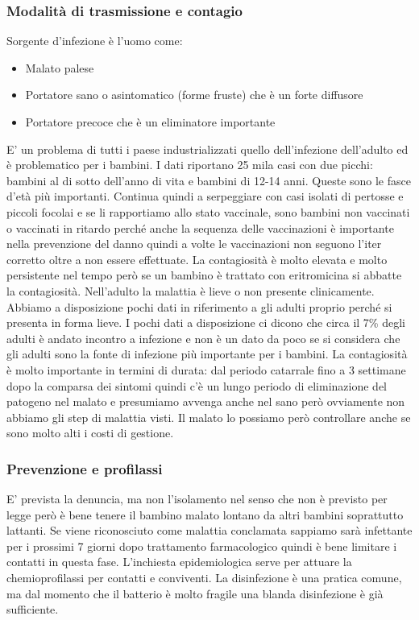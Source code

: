 \subsubsection{Modalità di trasmissione e contagio}

  Sorgente d'infezione è l'uomo come:

\begin{itemize}
\item
  Malato palese
\item
  Portatore sano o asintomatico (forme fruste) che è un forte diffusore
\item
  Portatore precoce che è un eliminatore importante
\end{itemize}

  E' un problema di tutti i paese industrializzati quello dell'infezione
  dell'adulto ed è problematico per i bambini. I dati riportano 25 mila
  casi con due picchi: bambini al di sotto dell'anno di vita e bambini
  di 12-14 anni. Queste sono le fasce d'età più importanti. Continua
  quindi a serpeggiare con casi isolati di pertosse e piccoli focolai e
  se li rapportiamo allo stato vaccinale, sono bambini non vaccinati o
  vaccinati in ritardo perché anche la sequenza delle vaccinazioni è
  importante nella prevenzione del danno quindi a volte le vaccinazioni
  non seguono l'iter corretto oltre a non essere effettuate. La
  contagiosità è molto elevata e molto persistente nel tempo però se un
  bambino è trattato con eritromicina si abbatte la contagiosità.
  Nell'adulto la malattia è lieve o non presente clinicamente. Abbiamo a
  disposizione pochi dati in riferimento a gli adulti proprio perché si
  presenta in forma lieve. I pochi dati a disposizione ci dicono che
  circa il 7\% degli adulti è andato incontro a infezione e non è un
  dato da poco se si considera che gli adulti sono la fonte di infezione
  più importante per i bambini. La contagiosità è molto importante in
  termini di durata: dal periodo catarrale fino a 3 settimane dopo la
  comparsa dei sintomi quindi c'è un lungo periodo di eliminazione del
  patogeno nel malato e presumiamo avvenga anche nel sano però
  ovviamente non abbiamo gli step di malattia visti. Il malato lo
  possiamo però controllare anche se sono molto alti i costi di
  gestione.

\subsubsection{Prevenzione e profilassi}

  E' prevista la denuncia, ma non l'isolamento nel senso che non è
  previsto per legge però è bene tenere il bambino malato lontano da
  altri bambini soprattutto lattanti. Se viene riconosciuto come
  malattia conclamata sappiamo sarà infettante per i prossimi 7 giorni
  dopo trattamento farmacologico quindi è bene limitare i contatti in
  questa fase. L'inchiesta epidemiologica serve per attuare la
  chemioprofilassi per contatti e conviventi. La disinfezione è una
  pratica comune, ma dal momento che il batterio è molto fragile una
  blanda disinfezione è già sufficiente.

